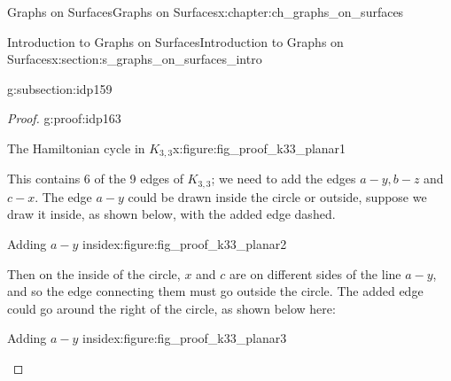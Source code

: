 \documentclass[oneside,10pt,]{book}
\numberwithin{equation}{section}
\begin{document}
\begin{chapterptx}{Graphs on Surfaces}{}{Graphs on Surfaces}{}{}{x:chapter:ch_graphs_on_surfaces}
\begin{sectionptx}{Introduction to Graphs on Surfaces}{}{Introduction to Graphs on Surfaces}{}{}{x:section:s_graphs_on_surfaces_intro}
\begin{subsectionptx}{}{}{}{}{}{g:subsection:idp159}
\begin{proof}{}{g:proof:idp163}
\begin{figureptx}{The Hamiltonian cycle in \(K_{3,3}\)}{x:figure:fig_proof_k33_planar1}{}
\begin{image}{0.15}{0.7}{0.15}%
%
\end{image}%
\tcblower
\end{figureptx}%
This contains 6 of the 9 edges of \(K_{3,3}\); we need to add the edges \(a-y, b-z\) and \(c-x\).  The edge \(a-y\) could be drawn inside the circle or outside, suppose we draw it inside, as shown below, with the added edge dashed.%
\begin{figureptx}{Adding \(a-y\) inside}{x:figure:fig_proof_k33_planar2}{}%
\begin{image}{0.15}{0.7}{0.15}%
%
\end{image}%
\tcblower
\end{figureptx}%
Then on the inside of the circle, \(x\) and \(c\) are on different sides of the line \(a-y\), and so the edge connecting them must go outside the circle.  The added edge could go around the right of the circle, as shown below here:%
\begin{figureptx}{Adding \(a-y\) inside}{x:figure:fig_proof_k33_planar3}{}%
\begin{image}{0.15}{0.7}{0.15}%
\end{image}
\end{figureptx}
\end{proof}
\end{subsectionptx}
\end{sectionptx}
\end{chapterptx}
\end{document}
